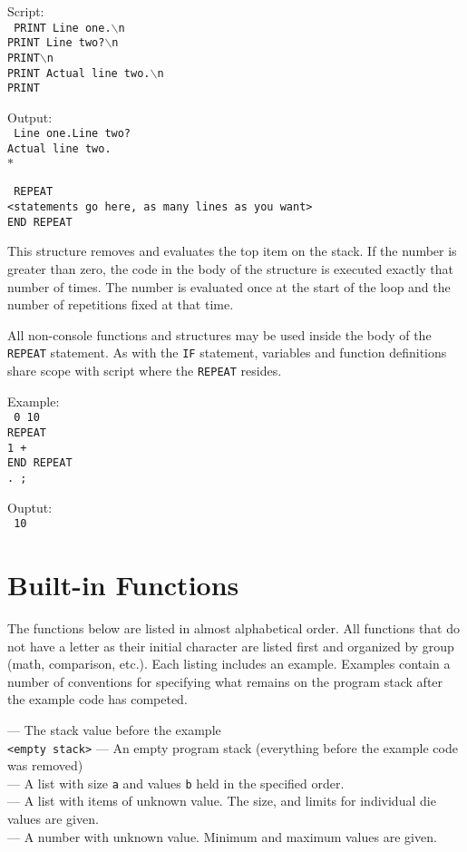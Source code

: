 \noindent Script:\\
\texttt{%
PRINT Line one.$\backslash$n\\
PRINT Line two?$\backslash$n\\
PRINT$\backslash$n\\
PRINT Actual line two.$\backslash$n\\
PRINT
}

\noindent Output:\\
\texttt{%
Line one.Line two?\\
Actual line two.\\
$\ast$
}

\breakline

\noindent\texttt{%
REPEAT\\
<statements go here, as many lines as you want>\\
END REPEAT}

This structure removes and evaluates the top item on the stack. If the number
is greater than zero, the code in the body of the structure is executed exactly
that number of times. The number is evaluated once at the start of the loop
and the number of repetitions fixed at that time.

All non-console functions and structures may be used inside the body of the
\texttt{REPEAT} statement. As with the \texttt{IF} statement, variables and
function definitions share scope with script where the \texttt{REPEAT}
resides.

\noindent Example:\\
\texttt{%
0 10 \\
REPEAT \\
1 +\\
END REPEAT\\
. ;}

Ouptut:\\
\texttt{%
10
}

\section{Built-in Functions}
\label{builtInFunctions}
The functions below are listed in almost alphabetical order. All functions that
do not have a letter as their initial character are listed first and organized
by group (math, comparison, etc.). Each listing includes an example. Examples
contain a number of conventions for specifying what remains on the program stack
after the example code has competed.

\noindent\texttt{\ostack} --- The stack value before the example\\
\texttt{<empty stack>} --- An empty program stack (everything before the example
code was removed)\\
\texttt{} --- A list with size \texttt{a} and values
\texttt{b} held in the specified order.\\
\texttt{} --- A list with items of unknown value. The size,
and limits for individual die values are given.\\
\texttt{} --- A number with unknown value. Minimum and 
maximum values are given.

